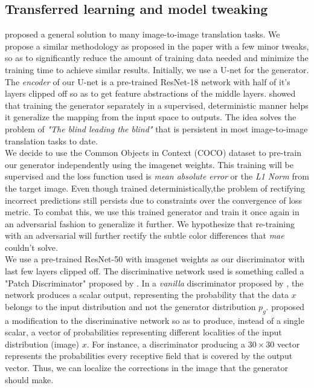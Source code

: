\documentclass[oneside,a4paper,12pt]{report}
\begin{document}
\subsection{Transferred learning and model tweaking}
\hspace*{0.25 in}\cite{isola2018imagetoimage} proposed a general solution to many image-to-image translation tasks. We propose a similar methodology as proposed in the paper with a few minor tweaks, so as to significantly reduce the amount of training data needed and minimize the training time to achieve similar results. Initially, we use a U-net for the generator. The \textit{encoder} of our U-net is a pre-trained ResNet-18 network with half of it's layers clipped off so as to get feature abstractions of the middle layers. \cite{ledig2017photorealistic} showed that training the generator separately in a supervised, deterministic manner helps it generalize the mapping from the input space to outputs. The idea solves the problem of \textit{"The blind leading the blind"} that is persistent in most image-to-image translation tasks to date. \\
\hspace*{0.25 in}We decide to use the Common Objects in Context (COCO) dataset to pre-train our generator independently using the imagenet weights. This training will be supervised and the loss function used is \textit{mean absolute error} or the \textit{L1 Norm} from the target image. Even though trained deterministically,the problem of rectifying incorrect predictions still persists due to constraints over the convergence of loss metric. To combat this, we use this trained generator and train it once again in an adversarial fashion to generalize it further. We hypothesize that re-training with an adversarial will further rectify the subtle color differences that \textit{mae} couldn't solve.\\
\hspace*{0.25 in}We use a pre-trained ResNet-50 with imagenet weights as our discriminator with last few layers clipped off. The discriminative network used is something called a "Patch Discriminator" proposed by \cite{isola2018imagetoimage}. In a \textit{vanilla} discriminator proposed by \cite{goodfellow2014generative}, the network produces a scalar output, representing the probability that the data $x$ belongs to the input distribution and not the generator distribution $p_g$. \cite{isola2018imagetoimage} proposed a modification to the discriminative network so as to produce, instead of a single scalar, a vector of probabilities representing different localities of the input distribution (image) $x$. For instance, a discriminator producing a $30 \times 30$ vector represents the probabilities every receptive field that is covered by the output vector. Thus, we can localize the corrections in the image that the generator should make.\\
\end{document}
